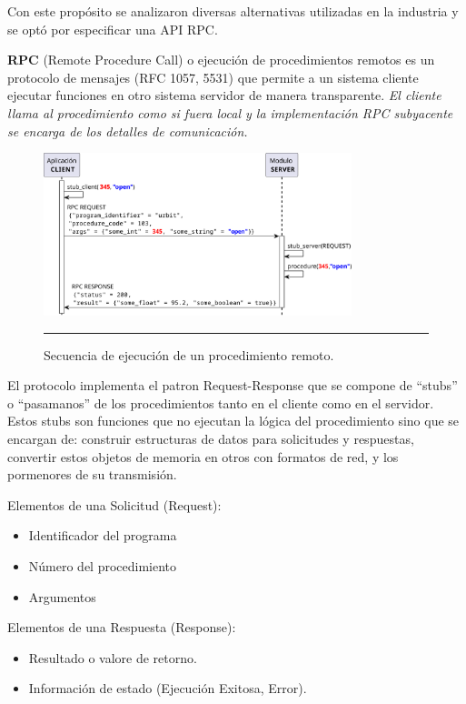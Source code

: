 Con este propósito se analizaron diversas alternativas utilizadas en la industria y se optó por especificar una API RPC.

\textbf{RPC} (Remote Procedure Call) o ejecución de procedimientos remotos es un protocolo de mensajes (RFC 1057, 5531) que permite a un sistema cliente ejecutar funciones en otro sistema servidor de manera transparente. 
\emph{El cliente llama al procedimiento como si fuera local y la implementación RPC subyacente se encarga de los detalles de comunicación.}

\begin{figure}[htbp]
	\centering
	\includegraphics[width=0.8\textwidth]{Figures/design/SEQ_rpc_ink.png}
	\rule{35em}{1pt}
	\caption[Connection Diagram]{Secuencia de ejecución de un procedimiento remoto.}
	\label{fig:seq_rpc}
\end{figure}

El protocolo implementa el patron Request-Response que se compone de ``stubs'' o ``pasamanos'' de los procedimientos tanto en el cliente como en el servidor. Estos stubs son funciones que no ejecutan la lógica del procedimiento sino que se encargan de: construir estructuras de datos para solicitudes y respuestas, convertir estos objetos de memoria en otros con formatos de red, y los pormenores de su transmisión.


Elementos de una Solicitud (Request):
\begin{itemize}
	\item Identificador del programa
	\item Número del procedimiento
	\item Argumentos
\end{itemize}

Elementos de una Respuesta (Response):
\begin{itemize}
	\item Resultado o valore de retorno.
	\item Información de estado (Ejecución Exitosa, Error).
\end{itemize}

